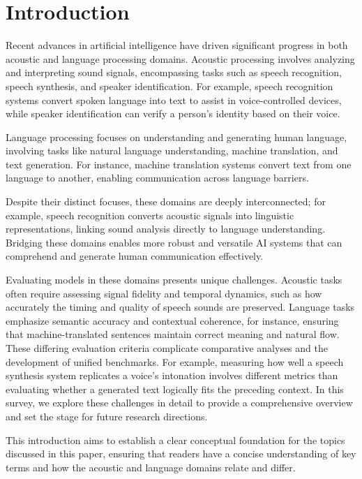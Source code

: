\documentclass[sigconf]{acmart}
\begin{document}
\maketitle

\section{Introduction}

Recent advances in artificial intelligence have driven significant progress in both acoustic and language processing domains. Acoustic processing involves analyzing and interpreting sound signals, encompassing tasks such as speech recognition, speech synthesis, and speaker identification. For example, speech recognition systems convert spoken language into text to assist in voice-controlled devices, while speaker identification can verify a person's identity based on their voice.

Language processing focuses on understanding and generating human language, involving tasks like natural language understanding, machine translation, and text generation. For instance, machine translation systems convert text from one language to another, enabling communication across language barriers.

Despite their distinct focuses, these domains are deeply interconnected; for example, speech recognition converts acoustic signals into linguistic representations, linking sound analysis directly to language understanding. Bridging these domains enables more robust and versatile AI systems that can comprehend and generate human communication effectively.

Evaluating models in these domains presents unique challenges. Acoustic tasks often require assessing signal fidelity and temporal dynamics, such as how accurately the timing and quality of speech sounds are preserved. Language tasks emphasize semantic accuracy and contextual coherence, for instance, ensuring that machine-translated sentences maintain correct meaning and natural flow. These differing evaluation criteria complicate comparative analyses and the development of unified benchmarks. For example, measuring how well a speech synthesis system replicates a voice’s intonation involves different metrics than evaluating whether a generated text logically fits the preceding context. In this survey, we explore these challenges in detail to provide a comprehensive overview and set the stage for future research directions.

This introduction aims to establish a clear conceptual foundation for the topics discussed in this paper, ensuring that readers have a concise understanding of key terms and how the acoustic and language domains relate and differ.
\end{document}
